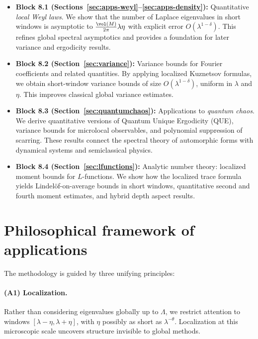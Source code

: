 \begin{itemize}
\item \textbf{Block 8.1 (Sections~\ref{sec:apps-weyl}--\ref{sec:apps-density}):}  
Quantitative \emph{local Weyl laws}. We show that the number of Laplace eigenvalues in short windows is asymptotic to $\tfrac{\vol(M)}{2\pi}\lambda\eta$ with explicit error $O(\lambda^{1-\delta})$. This refines global spectral asymptotics and provides a foundation for later variance and ergodicity results.

\item \textbf{Block 8.2 (Section~\ref{sec:variance}):}  
Variance bounds for Fourier coefficients and related quantities. By applying localized Kuznetsov formulas, we obtain short-window variance bounds of size $O(\lambda^{1-\delta})$, uniform in $\lambda$ and $\eta$. This improves classical global variance estimates.

\item \textbf{Block 8.3 (Section~\ref{sec:quantumchaos}):}  
Applications to \emph{quantum chaos}. We derive quantitative versions of Quantum Unique Ergodicity (QUE), variance bounds for microlocal observables, and polynomial suppression of scarring. These results connect the spectral theory of automorphic forms with dynamical systems and semiclassical physics.

\item \textbf{Block 8.4 (Section~\ref{sec:lfunctions}):}  
Analytic number theory: localized moment bounds for $L$-functions. We show how the localized trace formula yields Lindelöf-on-average bounds in short windows, quantitative second and fourth moment estimates, and hybrid depth aspect results.
\end{itemize}

\section{Philosophical framework of applications}

The methodology is guided by three unifying principles:

\paragraph{(A1) Localization.}  
Rather than considering eigenvalues globally up to $\Lambda$, we restrict attention to windows $[\lambda-\eta,\lambda+\eta]$, with $\eta$ possibly as short as $\lambda^{-\theta}$. Localization at this microscopic scale uncovers structure invisible to global methods.

